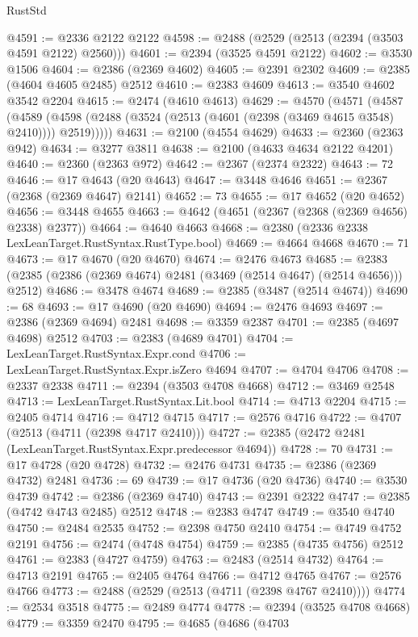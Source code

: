 \begin{lexlean}{RustStd}
\begin{coremodule}
{\begin{coremodule}
{{{{{{{{{{{{{{{{{{{{{{{{{{{{{{{{{{{{{{{{{{{{{{{{{{@4591 := @2336 @2122 @2122
@4598 := @2488 (@2529 (@2513 (@2394 (@3503 @4591 @2122) @2560)))
@4601 := @2394 (@3525 @4591 @2122)
@4602 := @3530 @1506
@4604 := @2386 (@2369 @4602)
@4605 := @2391 @2302
@4609 := @2385 (@4604 @4605 @2485) @2512
@4610 := @2383 @4609
@4613 := @3540 @4602 @3542 @2204
@4615 := @2474 (@4610 @4613)
@4629 := @4570
    (@4571
      (@4587
        (@4589 (@4598 (@2488 (@3524 (@2513 (@4601 (@2398 (@3469 @4615 @3548) @2410)))) @2519)))))
@4631 := @2100 (@4554 @4629)
@4633 := @2360 (@2363 @942)
@4634 := @3277 @3811
@4638 := @2100 (@4633 @4634 @2122 @4201)
@4640 := @2360 (@2363 @972)
@4642 := @2367 (@2374 @2322)
@4643 := 72
@4646 := @17 @4643 (@20 @4643)
@4647 := @3448 @4646
@4651 := @2367 (@2368 (@2369 @4647) @2141)
@4652 := 73
@4655 := @17 @4652 (@20 @4652)
@4656 := @3448 @4655
@4663 := @4642 (@4651 (@2367 (@2368 (@2369 @4656) @2338) @2377))
@4664 := @4640 @4663
@4668 := @2380 (@2336 @2338 LexLeanTarget.RustSyntax.RustType.bool)
@4669 := @4664 @4668
@4670 := 71
@4673 := @17 @4670 (@20 @4670)
@4674 := @2476 @4673
@4685 := @2383 (@2385 (@2386 (@2369 @4674) @2481 (@3469 (@2514 @4647) (@2514 @4656))) @2512)
@4686 := @3478 @4674
@4689 := @2385 (@3487 (@2514 @4674))
@4690 := 68
@4693 := @17 @4690 (@20 @4690)
@4694 := @2476 @4693
@4697 := @2386 (@2369 @4694) @2481
@4698 := @3359 @2387
@4701 := @2385 (@4697 @4698) @2512
@4703 := @2383 (@4689 @4701)
@4704 := LexLeanTarget.RustSyntax.Expr.cond
@4706 := LexLeanTarget.RustSyntax.Expr.isZero @4694
@4707 := @4704 @4706
@4708 := @2337 @2338
@4711 := @2394 (@3503 @4708 @4668)
@4712 := @3469 @2548
@4713 := LexLeanTarget.RustSyntax.Lit.bool
@4714 := @4713 @2204
@4715 := @2405 @4714
@4716 := @4712 @4715
@4717 := @2576 @4716
@4722 := @4707 (@2513 (@4711 (@2398 @4717 @2410)))
@4727 := @2385 (@2472 @2481 (LexLeanTarget.RustSyntax.Expr.predecessor @4694))
@4728 := 70
@4731 := @17 @4728 (@20 @4728)
@4732 := @2476 @4731
@4735 := @2386 (@2369 @4732) @2481
@4736 := 69
@4739 := @17 @4736 (@20 @4736)
@4740 := @3530 @4739
@4742 := @2386 (@2369 @4740)
@4743 := @2391 @2322
@4747 := @2385 (@4742 @4743 @2485) @2512
@4748 := @2383 @4747
@4749 := @3540 @4740
@4750 := @2484 @2535
@4752 := @2398 @4750 @2410
@4754 := @4749 @4752 @2191
@4756 := @2474 (@4748 @4754)
@4759 := @2385 (@4735 @4756) @2512
@4761 := @2383 (@4727 @4759)
@4763 := @2483 (@2514 @4732)
@4764 := @4713 @2191
@4765 := @2405 @4764
@4766 := @4712 @4765
@4767 := @2576 @4766
@4773 := @2488 (@2529 (@2513 (@4711 (@2398 @4767 @2410))))
@4774 := @2534 @3518
@4775 := @2489 @4774
@4778 := @2394 (@3525 @4708 @4668)
@4779 := @3359 @2470
@4795 := @4685
    (@4686
      (@4703
}}}}}}}}}}}}}}}}}}}}}}}}}}}}}}}}}}}}}}}}}}}}}}}}}}
\end{coremodule}}
\end{coremodule}
\end{lexlean}
